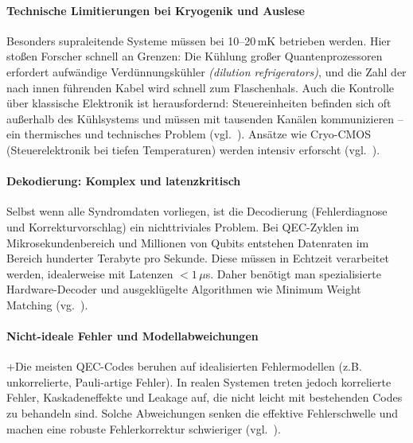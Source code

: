 \paragraph{Technische Limitierungen bei Kryogenik und Auslese}
Besonders supraleitende Systeme m\"ussen bei 10--20\,mK betrieben werden. Hier stoßen Forscher schnell an Grenzen: Die K\"uhlung gro\ss er Quantenprozessoren erfordert aufw\"andige Verd\"unnungsk\"uhler \emph{(dilution refrigerators)}, und die Zahl der nach innen f\"uhrenden Kabel wird schnell zum Flaschenhals.  Auch die Kontrolle \"uber klassische Elektronik ist herausfordernd: Steuereinheiten befinden sich oft au\ss erhalb des K\"uhlsystems und m\"ussen mit tausenden Kan\"alen kommunizieren -- ein thermisches und technisches Problem (vgl.~\cite[1]{krinner_engineering_2019}). Ans\"atze wie Cryo-CMOS (Steuerelektronik bei tiefen Temperaturen) werden intensiv erforscht (vgl.~\cite[13.5.1-13.5.2]{charbon_cryo-cmos_2016}).
\medskip
\paragraph{Dekodierung: Komplex und latenzkritisch}
Selbst wenn alle Syndromdaten vorliegen, ist die Decodierung (Fehlerdiagnose und Korrekturvorschlag) ein nichttriviales Problem. Bei QEC-Zyklen im Mikrosekundenbereich und Millionen von Qubits entstehen Datenraten im Bereich hunderter Terabyte pro Sekunde. Diese m\"ussen in Echtzeit verarbeitet werden, idealerweise mit Latenzen $<1\,\mu$s. Daher ben\"otigt man spezialisierte Hardware-Decoder und ausgekl\"ugelte Algorithmen wie Minimum Weight Matching (vg.~\cite[3-4]{wu_micro_2025}).
\medskip
\paragraph{Nicht-ideale Fehler und Modellabweichungen}
+Die meisten QEC-Codes beruhen auf idealisierten Fehlermodellen (z.B. unkorrelierte, Pauli-artige Fehler). In realen Systemen treten jedoch korrelierte Fehler, Kaskadeneffekte und Leakage auf, die nicht leicht mit bestehenden Codes zu behandeln sind. Solche Abweichungen senken die effektive Fehlerschwelle und machen eine robuste Fehlerkorrektur schwieriger (vgl.~\cite[312]{terhal_quantum_2015}).
\medskip
